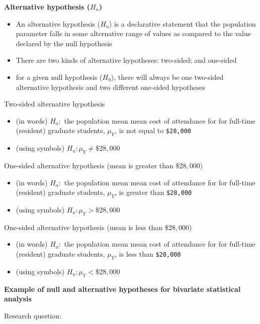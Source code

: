 \documentclass[
  letterpaper,
  DIV=11,
  numbers=noendperiod]{scrartcl}
\providecommand{\tightlist}{%
  \setlength{\itemsep}{0pt}\setlength{\parskip}{0pt}}\usepackage{longtable,booktabs,array}
\begin{document}
\textbf{Alternative hypothesis (\(H_a\))}

\begin{itemize}
\tightlist
\item
  An alternative hypothesis (\(H_a\)) is a declarative statement that
  the population parameter falls in some alternative range of values as
  compared to the value declared by the null hypothesis
\item
  There are two kinds of alternative hypotheses: two-sided; and
  one-sided
\item
  for a given null hypothesis (\(H_0\)), there will always be one
  two-sided alternative hypothesis and two different one-sided
  hypotheses
\end{itemize}

Two-sided alternative hypothesis

\begin{itemize}
\tightlist
\item
  (in words) \(H_a:\) the population mean mean cost of attendance for
  for full-time (resident) graduate students, \(\mu_Y\), is not equal to
  \texttt{\$28,000}
\item
  (using symbols) \(H_a:\mu_Y \neq \$28,000\)
\end{itemize}

One-sided alternative hypothesis (mean is greater than \(\$28,000\))

\begin{itemize}
\tightlist
\item
  (in words) \(H_a:\) the population mean mean cost of attendance for
  for full-time (resident) graduate students, \(\mu_Y\), is greater than
  \texttt{\$28,000}
\item
  (using symbols) \(H_a:\mu_Y > \$28,000\)
\end{itemize}

One-sided alternative hypothesis (mean is less than \(\$28,000\))

\begin{itemize}
\tightlist
\item
  (in words) \(H_a:\) the population mean mean cost of attendance for
  for full-time (resident) graduate students, \(\mu_Y\), is less than
  \texttt{\$28,000}
\item
  (using symbols) \(H_a:\mu_Y < \$28,000\)
\end{itemize}

\textbf{Example of null and alternative hypotheses for bivariate
statistical analysis}

Research question:
\end{document}
